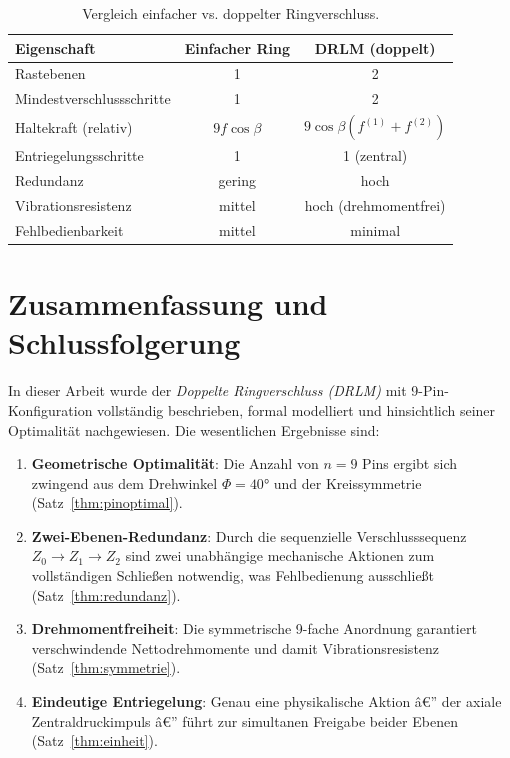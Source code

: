 ﻿\documentclass[12pt, a4paper]{article}
\theoremstyle{remark}
\begin{document}
\begin{table}[H]
  \centering
  \caption{Vergleich einfacher vs. doppelter Ringverschluss.}
  \label{tab:vergleich}
  \begin{tabular}{lcc}
    \toprule
    \textbf{Eigenschaft} & \textbf{Einfacher Ring} & \textbf{DRLM (doppelt)} \\
    \midrule
    Rastebenen & 1 & 2 \\
    Mindestverschlussschritte & 1 & 2 \\
    Haltekraft (relativ) & $9f\cos\beta$ & $9\cos\beta(f^{(1)}+f^{(2)})$ \\
    Entriegelungsschritte & 1 & 1 (zentral) \\
    Redundanz & gering & hoch \\
    Vibrationsresistenz & mittel & hoch (drehmomentfrei) \\
    Fehlbedienbarkeit & mittel & minimal \\
    \bottomrule
  \end{tabular}
\end{table}

\section{Zusammenfassung und Schlussfolgerung}

In dieser Arbeit wurde der \emph{Doppelte Ringverschluss (DRLM)} mit 9-Pin-Konfiguration
vollständig beschrieben, formal modelliert und hinsichtlich seiner Optimalität nachgewiesen.
Die wesentlichen Ergebnisse sind:

\begin{enumerate}
  \item \textbf{Geometrische Optimalität}: Die Anzahl von $n = 9$ Pins ergibt sich zwingend
        aus dem Drehwinkel $\Phi = 40 °$ und der Kreissymmetrie (Satz~\ref{thm:pinoptimal}).

  \item \textbf{Zwei-Ebenen-Redundanz}: Durch die sequenzielle Verschlusssequenz
        $Z_0 \to Z_1 \to Z_2$ sind zwei unabhängige mechanische Aktionen zum vollständigen
        Schließen notwendig, was Fehlbedienung ausschließt (Satz~\ref{thm:redundanz}).

  \item \textbf{Drehmomentfreiheit}: Die symmetrische 9-fache Anordnung garantiert
        verschwindende Nettodrehmomente und damit Vibrationsresistenz (Satz~\ref{thm:symmetrie}).

  \item \textbf{Eindeutige Entriegelung}: Genau eine physikalische Aktion â€” der axiale
        Zentraldruckimpuls â€” führt zur simultanen Freigabe beider Ebenen (Satz~\ref{thm:einheit}).
\end{enumerate}
\end{document}
